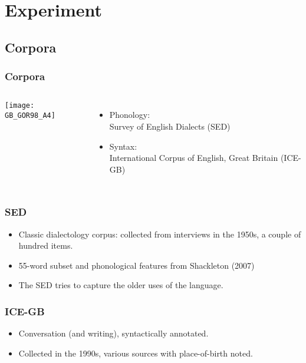 \documentclass{beamer}
\begin{document}
\section{Experiment}
\subsection{Corpora}
\begin{frame}
  \frametitle{Corpora}
  \begin{columns}
  \texttt{[image: GB\_GOR98\_A4]}
  \begin{itemize}
  \item Phonology: \\ Survey of English Dialects (SED)
  \item Syntax: \\ International Corpus of English, Great Britain
    (ICE-GB)
  \end{itemize}
    \end{columns}
\end{frame}
\begin{frame}
  \frametitle{SED}
  \begin{itemize}
  \item Classic dialectology corpus: collected from interviews in the
    1950s, a couple of hundred items.
  \item 55-word subset and phonological features from Shackleton (2007)
  \item The SED tries to capture the older uses of the language.
  \end{itemize}
\end{frame}
\begin{frame}
  \frametitle{ICE-GB}
  \begin{itemize}
  \item Conversation (and writing), syntactically annotated.
  \item Collected in the 1990s, various sources with place-of-birth noted.
  \end{itemize}
\end{frame}
\end{document}
